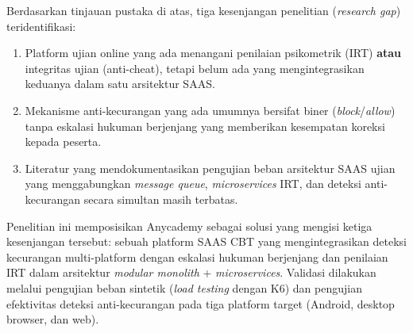 Berdasarkan tinjauan pustaka di atas, tiga kesenjangan penelitian (\textit{research gap}) teridentifikasi:
\begin{enumerate}
	\item Platform ujian online yang ada menangani penilaian psikometrik (IRT) \textbf{atau} integritas ujian (anti-cheat), tetapi belum ada yang mengintegrasikan keduanya dalam satu arsitektur SAAS.
	\item Mekanisme anti-kecurangan yang ada umumnya bersifat biner (\textit{block}/\textit{allow}) tanpa eskalasi hukuman berjenjang yang memberikan kesempatan koreksi kepada peserta.
	\item Literatur yang mendokumentasikan pengujian beban arsitektur SAAS ujian yang menggabungkan \textit{message queue}, \textit{microservices} IRT, dan deteksi anti-kecurangan secara simultan masih terbatas.
\end{enumerate}

Penelitian ini memposisikan Anycademy sebagai solusi yang mengisi ketiga kesenjangan tersebut: sebuah platform SAAS CBT yang mengintegrasikan deteksi kecurangan multi-platform dengan eskalasi hukuman berjenjang dan penilaian IRT dalam arsitektur \textit{modular monolith} + \textit{microservices}. Validasi dilakukan melalui pengujian beban sintetik (\textit{load testing} dengan K6) dan pengujian efektivitas deteksi anti-kecurangan pada tiga platform target (Android, desktop browser, dan web).
